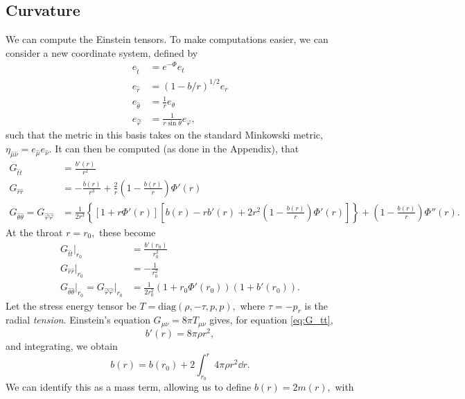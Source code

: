 \documentclass[%
 reprint,
 amsmath,amssymb
 aps,
]{revtex4}
\theoremstyle{remark}
\begin{document}
\subsection{Curvature}
We can compute the Einstein tensors. To make computations easier, we can consider a new coordinate system, defined by 
\begin{align}
    e_{\hat{t}} &= e^{-\Phi}e_t \\ 
    e_{\hat{r}} &= (1-b/r)^{1/2}e_r \\ 
    e_{\hat{\theta}} &= \frac{1}{r}e_{\theta} \\
    e_{\hat{\varphi}} &= \frac{1}{r\sin\theta}e_{\varphi},
\end{align}
such that the metric in this basis takes on the standard Minkowski metric, $\eta_{\hat{\mu}\hat{\nu}} = e_{\hat{\mu}}e_{\hat{\nu}}.$ It can then be computed (as done in the Appendix), that 
\begin{align}
    G_{\hat{t}\hat{t}} &= \frac{b'(r)}{r^2} \label{eq:G_tt} \\ 
    G_{\hat{r}\hat{r}} &= -\frac{b(r)}{r^3} + \frac{2}{r}\left(1-\frac{b(r)}{r}\right)\Phi'(r) \\ 
    G_{\hat{\theta}\hat{\theta}} = G_{\hat{\varphi}\hat{\varphi}} &= \frac{1}{2r^3}\left\{[1+r\Phi'(r)]\left[b(r)-rb'(r)+2r^2\left(1-\frac{b(r)}{r}\right)\Phi'(r)\right]\right\} + \left(1-\frac{b(r)}{r}\right)\Phi''(r).
\end{align}
At the throat $r=r_0,$ these become 
\begin{align}
    G_{\hat{t}\hat{t}}\bigg|_{r_0} &= \frac{b'(r_0)}{r_0^2} \\ 
    G_{\hat{r}\hat{r}}\bigg|_{r_0} &= -\frac{1}{r_0^2} \label{eq:G_rr0}\\ 
    G_{\hat{\theta}\hat{\theta}}\bigg|_{r_0} = G_{\hat{\varphi}\hat{\varphi}}\bigg|_{r_0} &= \frac{1}{2r_0^2}(1+r_0\Phi'(r_0))(1+b'(r_0)).
\end{align}
Let the stress energy tensor be $T=\text{diag}(\rho,-\tau,p,p),$ where $\tau = -p_r$ is the radial \textit{tension}. Einstein's equation $G_{\mu \nu}=8\pi T_{\mu\nu}$ gives, for equation \ref{eq:G_tt},
\begin{equation}
    b'(r) = 8\pi \rho r^2,
    \label{eq:b-v-r}
\end{equation}
and integrating, we obtain
\begin{equation}
    b(r) = b(r_0) + 2\int_{r_0}^{r} 4\pi \rho r^2 \dd{r}.
\end{equation}
We can identify this as a mass term, allowing us to define $b(r)=2m(r),$ with 
\end{document}
